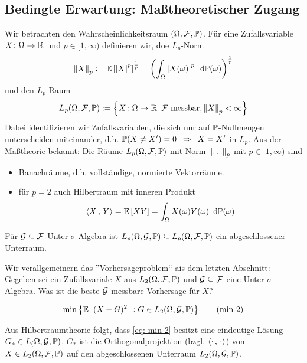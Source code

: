 \subsection{Bedingte Erwartung: Maßtheoretischer Zugang}

Wir betrachten den Wahrscheinlichkeitsraum $(\Omega, \F, \P)$. Für eine Zufallsvariable $\abb{X}{\Omega}{\R}$ und $p \in [1,\infty)$ definieren wir, doe $L_p$-Norm
\begin{equation*}
\norm{X}_p \defeq \EW[\abs{X}^p]^{\frac{1}{p}} = \brackets{\int_\Omega \abs{X(\omega)}^p \diffskip{\P(\omega)}}^\frac{1}{p}
\end{equation*}
und den $L_p$-Raum
\begin{equation*}
L_p(\Omega, \F, \P) \defeq \menge{\abb{X}{\Omega}{\R} \enskip \F\text{-messbar}, \norm{X}_p < \infty}
\end{equation*}
Dabei identifizieren wir Zufallsvariablen, die sich nur auf $\P$-Nullmengen unterscheiden miteinander, d.h. $\P(X \neq X') = 0 \follows X = X'$ in $L_p$. Aus der Maßtheorie bekannt: Die Räume $L_p(\Omega,\F,\P)$ mit Norm $\norm{\dots}_p$ mit $p \in [1,\infty)$ sind
\begin{itemize}
	\item Banachräume, d.h. vollständige, normierte Vektorräume.
	\item für $p=2$ auch Hilbertraum mit inneren Produkt 
	\begin{equation*}
	\scal{X}{Y} = \EW[XY] = \int_\Omega X(\omega) Y(\omega) \diffskip{\P(\omega)}
	\end{equation*}
\end{itemize}

Für $\G \subseteq \F$ Unter-$\sigma$-Algebra ist $L_p(\Omega,\G,\P) \subseteq L_p(\Omega, \F, \P)$ ein abgeschlossener Unterraum.

Wir verallgemeinern das ''Vorhersageproblem`` ais dem letzten Abschnitt: Gegeben sei ein Zufallsvariale $X$ aus $L_2(\Omega,\F,\P)$ und $\G \subseteq \F$ eine Unter-$\sigma$-Algebra. Was ist die beste $\G$-messbare Vorhersage für $X$?

\begin{equation}
\min\menge{\EW[(X-G)^2] : G \in L_2(\Omega,\G,\P)} \tag{min-2} \label{eq: min-2}
\end{equation}

Aus Hilbertraumtheorie folgt, dass \eqref{eq: min-2} besitzt eine eindeutige Lösung $G_\ast \in L_(\Omega, \G, \P)$. $G_\ast$ ist die Orthogonalprojektion (bzgl. $\scal{\cdot}{\cdot}$) von $X \in L_2(\Omega,\F,\P)$ auf den abgeschlossenen Unterraum $L_2(\Omega,\G,\P)$.

